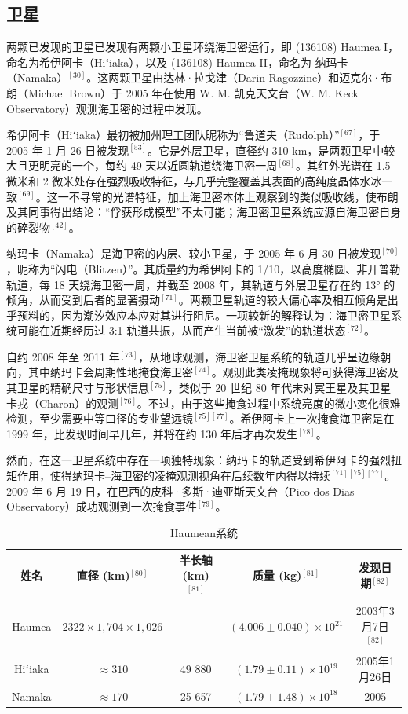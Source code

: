 \subsection{卫星}
两颗已发现的卫星已发现有两颗小卫星环绕海卫密运行，即 (136108) Haumea I，命名为希伊阿卡（Hiʻiaka），以及 (136108) Haumea II，命名为 纳玛卡（Namaka）$^{[30]}$。这两颗卫星由达林·拉戈津（Darin Ragozzine）和迈克尔·布朗（Michael Brown）于 2005 年在使用 W. M. 凯克天文台（W. M. Keck Observatory）观测海卫密的过程中发现。

希伊阿卡（Hiʻiaka）最初被加州理工团队昵称为“鲁道夫（Rudolph）”$^{[67]}$，于 2005 年 1 月 26 日被发现$^{[53]}$。它是外层卫星，直径约 310 km，是两颗卫星中较大且更明亮的一个，每约 49 天以近圆轨道绕海卫密一周$^{[68]}$。其红外光谱在 1.5 微米和 2 微米处存在强烈吸收特征，与几乎完整覆盖其表面的高纯度晶体水冰一致$^{[69]}$。这一不寻常的光谱特征，加上海卫密本体上观察到的类似吸收线，使布朗及其同事得出结论：“俘获形成模型”不太可能；海卫密卫星系统应源自海卫密自身的碎裂物$^{[42]}$。

纳玛卡（Namaka）是海卫密的内层、较小卫星，于 2005 年 6 月 30 日被发现$^{[70]}$，昵称为“闪电（Blitzen）”。其质量约为希伊阿卡的 1/10，以高度椭圆、非开普勒轨道，每 18 天绕海卫密一周，并截至 2008 年，其轨道与外层卫星存在约 13° 的倾角，从而受到后者的显著摄动$^{[71]}$。两颗卫星轨道的较大偏心率及相互倾角是出乎预料的，因为潮汐效应本应对其进行阻尼。一项较新的解释认为：海卫密卫星系统可能在近期经历过 3:1 轨道共振，从而产生当前被“激发”的轨道状态$^{[72]}$。

自约 2008 年至 2011 年$^{[73]}$，从地球观测，海卫密卫星系统的轨道几乎呈边缘朝向，其中纳玛卡会周期性地掩食海卫密$^{[74]}$。观测此类凌掩现象将可获得海卫密及其卫星的精确尺寸与形状信息$^{[75]}$，类似于 20 世纪 80 年代末对冥王星及其卫星卡戎（Charon）的观测$^{[76]}$。不过，由于这些掩食过程中系统亮度的微小变化很难检测，至少需要中等口径的专业望远镜$^{[75][77]}$。希伊阿卡上一次掩食海卫密是在 1999 年，比发现时间早几年，并将在约 130 年后才再次发生$^{[78]}$。

然而，在这一卫星系统中存在一项独特现象：纳玛卡的轨道受到希伊阿卡的强烈扭矩作用，使得纳玛卡–海卫密的凌掩观测视角在后续数年内得以持续$^{[71][75][77]}$。2009 年 6 月 19 日，在巴西的皮科·多斯·迪亚斯天文台（Pico dos Dias Observatory）成功观测到一次掩食事件$^{[79]}$。
\begin{table}[ht]
\centering
\caption{Haumean系统}\label{tab_Haumea1}
\begin{tabular}{|c|c|c|c|c|}
\hline
\textbf{姓名}&\textbf{直径 (km)$^{[80]}$} & \textbf{半长轴 (km)$^{[81]}$} & \textbf{质量 (kg)$^{[81]}$} & \textbf{发现日期$^{[82]}$} \\
\hline
Haumea &  $2 322 \times 1,704 \times 1,026 $ &  & $ (4.006 \pm 0.040) \times 10^{21}$ & 2003年3月7日$^{[82]}$ \\
\hline
Hiʻiaka & $\approx310$ & 49 880 & $(1.79 \pm 0.11) \times 10^{19}$ & 2005年1月26日 \\
\hline
Namaka& $\approx170$ & 25 657 & $(1.79 \pm 1.48) \times 10^{18}$& 2005 \\
\hline
\end{tabular}
\end{table}
